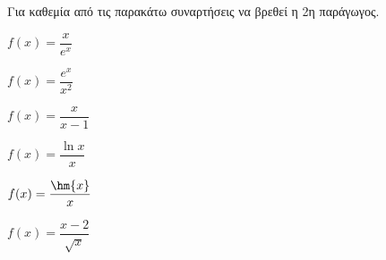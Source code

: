 Για καθεμία από τις παρακάτω συναρτήσεις να βρεθεί η 2η παράγωγος.
\begin{multicols}{2}
\begin{alist}
\item $ f(x)=\dfrac{x}{e^x} $
\item $ f(x)=\dfrac{e^x}{x^2} $
\item $ f(x)=\dfrac{x}{x-1} $
\item $ f(x)=\dfrac{\ln{x}}{x} $
\item $ f(x)=\dfrac{\hm{x}}{x} $
\item $ f(x)=\dfrac{x-2}{\sqrt{x}} $
\end{alist}
\end{multicols}
